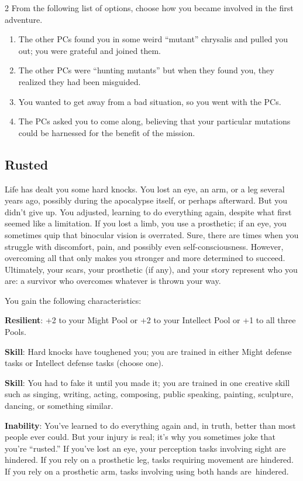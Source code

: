 \begin{multicols}{2}
From the following list of options, choose how you became involved in the first adventure.
\begin{enumerate}
\item  The other PCs found you in some weird “mutant” chrysalis and pulled you out; you were grateful and joined them.
\item  The other PCs were “hunting mutants” but when they found you, they realized they had been misguided.
\item  You wanted to get away from a bad situation, so you went with the PCs.
\item  The PCs asked you to come along, believing that your particular mutations could be harnessed for the benefit of the mission.
\end{enumerate}

\subsection{Rusted}

Life has dealt you some hard knocks. You lost an eye, an arm, or a leg several years ago, possibly during the apocalypse itself, or perhaps afterward. But you didn’t give up. You adjusted, learning to do everything again, despite what first seemed like a limitation. If you lost a limb, you use a prosthetic; if an eye, you sometimes quip that binocular vision is overrated. Sure, there are times when you struggle with discomfort, pain, and possibly even self-consciousness. However, overcoming all that only makes you stronger and more determined to succeed. Ultimately, your scars, your prosthetic (if any), and your story represent who you are: a survivor who overcomes whatever is thrown your way.

You gain the following characteristics:

\textbf{Resilient}: +2 to your Might Pool or +2 to your Intellect Pool or +1 to all three Pools.

\textbf{Skill}: Hard knocks have toughened you; you are trained in either Might defense tasks or Intellect defense tasks (choose one).

\textbf{Skill}: You had to fake it until you made it; you are trained in one creative skill such as singing, writing, acting, composing, public speaking, painting, sculpture, dancing, or something similar.

\textbf{Inability}: You’ve learned to do everything again and, in truth, better than most people ever could. But your injury is real; it’s why you sometimes joke that you’re “rusted.” If you’ve lost an eye, your perception tasks involving sight are hindered. If you rely on a prosthetic leg, tasks requiring movement are hindered. If you rely on a prosthetic arm, tasks involving using both hands are hindered.


\end{multicols}
